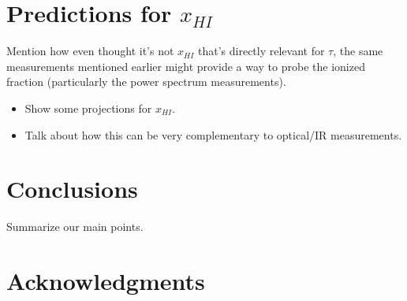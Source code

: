 \documentclass[twocolumn,aps,prd,nofootinbib,showpacs]{revtex4-1}
\begin{document}
\section{Predictions for $x_{HI}$}
Mention how even thought it's not $x_{HI}$ that's directly relevant for $\tau$, the same measurements mentioned earlier might provide a way to probe the ionized fraction (particularly the power spectrum measurements).
\begin{itemize}
\item Show some projections for $x_{HI}$.
\item Talk about how this can be very complementary to optical/IR measurements.
\end{itemize}

\section{Conclusions}
Summarize our main points.

\section*{Acknowledgments}



\end{document}
